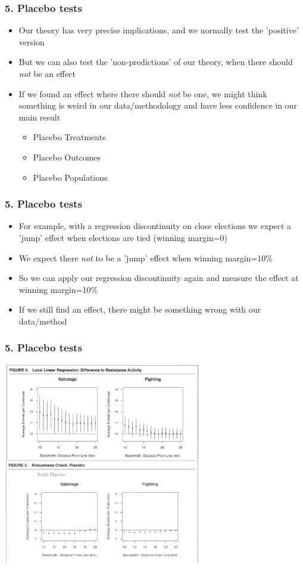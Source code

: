 \documentclass[xcolor=x11names,compress]{beamer}\usepackage[]{graphicx}\usepackage[]{xcolor}
\renewcommand{\(}{\begin{columns}}
\renewcommand{\)}{\end{columns}}
\newcommand{\<}[1]{\begin{column}{#1}}
\renewcommand{\>}{\end{column}}
\begin{document}
\begin{frame}
\frametitle{5. Placebo tests}
\begin{itemize}
\item Our theory has very precise implications, and we normally test the 'positive' version
\pause
\item But we can also test the 'non-predictions' of our theory, when there should \textit{not} be an effect
\pause
\item If we found an effect where there should \textit{not} be one, we might think something is weird in our data/methodology and have less confidence in our main result
\begin{itemize}
\item Placebo Treatments
\item Placebo Outcomes
\item Placebo Populations
\end{itemize}
\end{itemize}
\end{frame}

\begin{frame}
\frametitle{5. Placebo tests}
\begin{itemize}
\item For example, with a regression discontinuity on close elections we expect a 'jump' effect when elections are tied (winning margin=0)
\pause
\item We expect there \textit{not} to be a 'jump' effect when winning margin=10\%
\pause
\item So we can apply our regression discontinuity again and measure the effect at winning margin=10\%
\pause
\item If we still find an effect, there might be something wrong with our data/method
\end{itemize}
\end{frame}

\begin{frame}
\frametitle{5. Placebo tests}
\includegraphics[width=0.65\textwidth]{Placebo_rd.png}
\end{frame}
\end{document}
